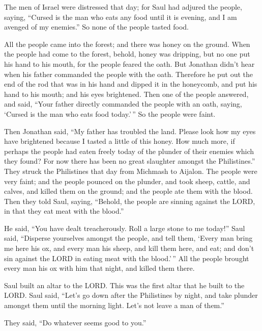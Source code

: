  The men of Israel were distressed that day; for Saul had
adjured the people, saying, ``Cursed is the man who eats any food until
it is evening, and I am avenged of my enemies.'' So none of the people
tasted food.

 All the people came into the forest; and there was honey
on the ground.  When the people had come to the forest,
behold, honey was dripping, but no one put his hand to his mouth, for
the people feared the oath.  But Jonathan didn't hear
when his father commanded the people with the oath. Therefore he put out
the end of the rod that was in his hand and dipped it in the honeycomb,
and put his hand to his mouth; and his eyes brightened. 
Then one of the people answered, and said, ``Your father directly
commanded the people with an oath, saying, `Cursed is the man who eats
food today.'\,'' So the people were faint.

 Then Jonathan said, ``My father has troubled the land.
Please look how my eyes have brightened because I tasted a little of
this honey.  How much more, if perhaps the people had
eaten freely today of the plunder of their enemies which they found? For
now there has been no great slaughter amongst the Philistines.''
 They struck the Philistines that day from Michmash to
Aijalon. The people were very faint;  and the people
pounced on the plunder, and took sheep, cattle, and calves, and killed
them on the ground; and the people ate them with the blood.
 Then they told Saul, saying, ``Behold, the people are
sinning against the LORD, in that they eat meat with the blood.''

He said, ``You have dealt treacherously. Roll a large stone to me
today!''  Saul said, ``Disperse yourselves amongst the
people, and tell them, `Every man bring me here his ox, and every man
his sheep, and kill them here, and eat; and don't sin against the LORD
in eating meat with the blood.'\,'' All the people brought every man his
ox with him that night, and killed them there.

 Saul built an altar to the LORD. This was the first
altar that he built to the LORD.  Saul said, ``Let's go
down after the Philistines by night, and take plunder amongst them until
the morning light. Let's not leave a man of them.''

They said, ``Do whatever seems good to you.''

